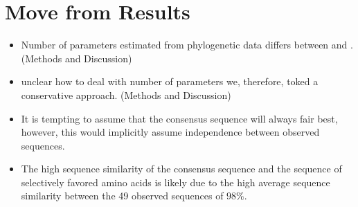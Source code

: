 \documentclass[12pt]{article}
\begin{document}
\section*{Move from Results}
\begin{itemize}
\item Number of parameters estimated from phylogenetic data differs between \selac and \phydms. (Methods and Discussion)
\item unclear how to deal with number of parameters we, therefore, toked a conservative approach. (Methods and Discussion)
  \item It is tempting to assume that the consensus sequence will always fair best, however, this would implicitly assume independence between observed sequences.
\item The high sequence similarity of the consensus sequence and the sequence of selectively favored amino acids is likely due to the high average sequence similarity between the 49 observed sequences of $98 \%$.
  \end{itemize}
\end{document}
